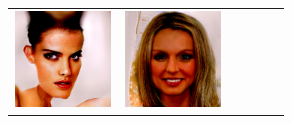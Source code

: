 \documentclass{article}
\newcommand{\pganw}{1.0in}
\begin{document}
\begin{table}[htbp]
\begin{center}
\begin{tabular}{cc|cc|cc}
\includegraphics[width=\pganw]{figures/pgan/10_base_iso_MH.png} &
\includegraphics[width=\pganw]{figures/pgan/11_base_iso_MH.png} \\

\end{tabular}
\end{center}
\end{table}
\end{document}
